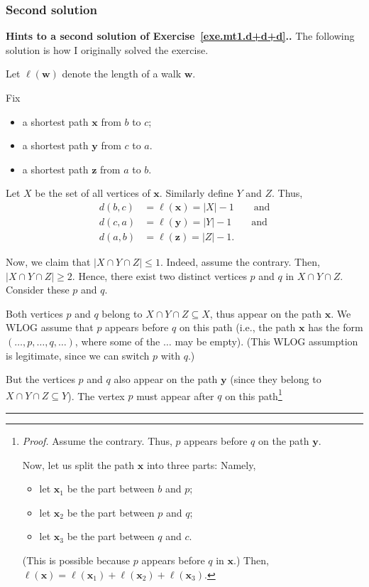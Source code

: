 \documentclass[numbers=enddot,12pt,final,onecolumn,notitlepage]{scrartcl}%
\newcounter{exer}
\theoremstyle{definition}
\newenvironment{proof}[1][Proof]{\noindent\textbf{#1.} }{\ \rule{0.5em}{0.5em}}
\newcommand{\abs}[1]{\left| #1 \right|}
\newcommand{\tup}[1]{\left( #1 \right)}
\begin{document}
\subsubsection{Second solution}

\begin{proof}[Hints to a second solution of Exercise~\ref{exe.mt1.d+d+d}.]
The following solution is how I originally solved the exercise.

Let $\ell\tup{\mathbf{w}}$ denote the length of a walk $\mathbf{w}$.

Fix
\begin{itemize}
\item a shortest path $\mathbf{x}$ from $b$ to $c$;
\item a shortest path $\mathbf{y}$ from $c$ to $a$.
\item a shortest path $\mathbf{z}$ from $a$ to $b$.
\end{itemize}
Let $X$ be the set of all vertices of $\mathbf{x}$. Similarly define
$Y$ and $Z$. Thus,
\begin{align}
d \tup{b, c} &= \ell\tup{\mathbf{x}} = \abs{X} - 1 \qquad \text{and}
\label{pf.exe.mt1.d+d+d.hint.d1} \\
d \tup{c, a} &= \ell\tup{\mathbf{y}} = \abs{Y} - 1 \qquad \text{and}
\label{pf.exe.mt1.d+d+d.hint.d2} \\
d \tup{a, b} &= \ell\tup{\mathbf{z}} = \abs{Z} - 1.
\label{pf.exe.mt1.d+d+d.hint.d3}
\end{align}

Now, we claim that $\abs{X \cap Y \cap Z} \leq 1$. Indeed, assume the
contrary. Then, $\abs{X \cap Y \cap Z} \geq 2$. Hence, there exist two
distinct vertices $p$ and $q$ in $X \cap Y \cap Z$. Consider these $p$
and $q$.

Both vertices $p$ and $q$ belong to $X \cap Y \cap Z \subseteq X$,
thus appear on the path $\mathbf{x}$.
We WLOG assume that $p$ appears before $q$ on this path (i.e., the
path $\mathbf{x}$ has the form
$\tup{\ldots, p, \ldots, q, \ldots}$, where some of the $\ldots$ may
be empty). (This WLOG assumption is legitimate, since we can switch
$p$ with $q$.)

But the vertices $p$ and $q$ also appear on the path $\mathbf{y}$
(since they belong to $X \cap Y \cap Z \subseteq Y$). The vertex $p$
must appear after $q$ on this path\footnote{\textit{Proof.} Assume
the contrary. Thus, $p$ appears before $q$ on the path $\mathbf{y}$.

Now, let us split the path $\mathbf{x}$ into three parts: Namely,
\begin{itemize}
\item let $\mathbf{x}_1$ be the part between $b$ and $p$;
\item let $\mathbf{x}_2$ be the part between $p$ and $q$;
\item let $\mathbf{x}_3$ be the part between $q$ and $c$.
\end{itemize}
(This is possible because $p$ appears before $q$ in $\mathbf{x}$.)
Then, $\ell\tup{\mathbf{x}} = \ell\tup{\mathbf{x}_1}
+ \ell\tup{\mathbf{x}_2} + \ell\tup{\mathbf{x}_3}$.

}
\end{proof}
\end{document}
